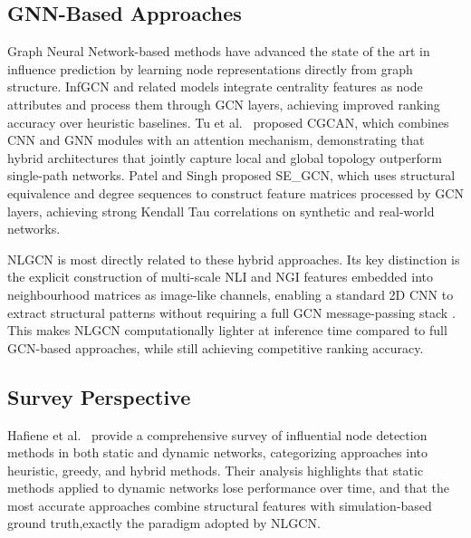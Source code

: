 \subsection{GNN-Based Approaches}

Graph Neural Network-based methods \cite{zhang2019gcn}
have advanced the state of the art in influence prediction by
learning node representations directly from graph structure.
InfGCN \cite{tu2025} and related models integrate centrality
features as node attributes and process them through GCN layers,
achieving improved ranking accuracy over heuristic baselines.
Tu et al.\ \cite{tu2025} proposed CGCAN, which combines CNN and
GNN modules with an attention mechanism, demonstrating that
hybrid architectures that jointly capture local and global topology
outperform single-path networks. Patel and Singh \cite{patel2025}
proposed SE\_GCN, which uses structural equivalence and degree
sequences to construct feature matrices processed by GCN layers,
achieving strong Kendall Tau correlations on synthetic and
real-world networks.

NLGCN \cite{guo2026} is most directly related to these hybrid
approaches. Its key distinction is the explicit construction of
multi-scale NLI and NGI features embedded into neighbourhood
matrices as image-like channels, enabling a standard 2D CNN
to extract structural patterns without requiring a full GCN
message-passing stack \cite{guo2026, zhang2019gcn}. This makes
NLGCN computationally lighter at inference time compared to
full GCN-based approaches, while still achieving competitive
ranking accuracy.

\subsection{Survey Perspective}

Hafiene et al.\ \cite{hafiene2020} provide a comprehensive survey
of influential node detection methods in both static and dynamic
networks, categorizing approaches into heuristic, greedy, and
hybrid methods. Their analysis highlights that static methods
applied to dynamic networks lose performance over time, and that
the most accurate approaches combine structural features with
simulation-based ground truth,exactly the paradigm adopted
by NLGCN.